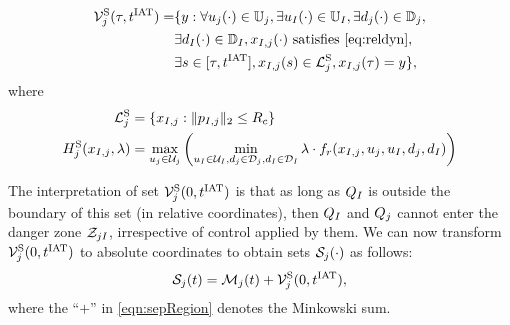 \begin{equation} \label{eqn:sepBRS}
\begin{aligned}
\brs^{\text{S}}_{j}(\tau, \iat) = & \{y: \forall \ctrl_j(\cdot) \in \cfset_j, \exists \ctrl_\intr(\cdot) \in \cfset_\intr, \exists \dstb_j(\cdot) \in \dfset_j, \\
& \exists \dstb_\intr(\cdot) \in \dfset_\intr, \state_{\intr, j}(\cdot) \text{ satisfies \eqref{eq:reldyn}},\\
& \exists s \in [\tau, \iat], \state_{\intr, j}(s) \in \targetset^{\text{S}}_{j}, \state_{\intr, j}(\tau) = y\},
\end{aligned}
\end{equation}
where 
\begin{equation}
\begin{aligned}
\mathcal{L}^{\text{S}}_{j} &= \{x_{I, j}: \|p_{I, j}\|_2 \le R_c\} \\
H^{\text{S}}_{j}(x_{I, j}, \lambda) &= \max_{u_j \in \mathcal{U}_j} \left( \min_{u_I \in \mathcal{U}_I, d_j \in \mathcal{D}_j, d_I \in \mathcal{D}_I} \lambda \cdot f_r(x_{I, j}, u_j, u_I, d_j, d_I) \right)
\end{aligned}
\end{equation}

The interpretation of set $\mathcal{V}^{\text{S}}_{j}(0, t^\text{IAT})$ is that as long as $Q_{I}$ is outside the boundary of this set (in relative coordinates), then $Q_{I}$ and $Q_{j}$ cannot enter the danger zone $\mathcal{Z}_{jI}$, irrespective of control applied by them.  We can now transform $\mathcal{V}^{\text{S}}_{j}(0, t^\text{IAT})$ to absolute coordinates to obtain sets $\mathcal{S}_j(\cdot)$ as follows:
\begin{equation} \label{eqn:sepRegion}
\sep_j(t) = \boset_j(t) + \brs^{\text{S}}_{j}(0, \iat),
\end{equation}
where the ``$+$'' in \eqref{eqn:sepRegion} denotes the Minkowski sum.